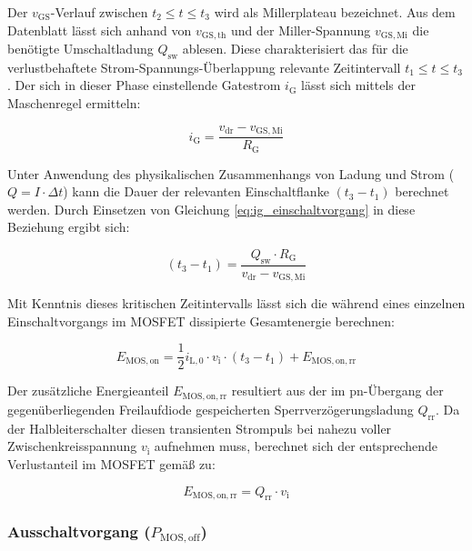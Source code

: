Der $v_\mathrm{GS}$-Verlauf zwischen $t_2 \le t \le t_3$ wird als Millerplateau bezeichnet. Aus dem Datenblatt lässt sich anhand von $v_\mathrm{GS,th}$ und der Miller-Spannung $v_\mathrm{GS,Mi}$ die benötigte Umschaltladung $Q_\mathrm{sw}$ ablesen. Diese charakterisiert das für die verlustbehaftete Strom-Spannungs-Überlappung relevante Zeitintervall $t_1 \le t \le t_3$. Der sich in dieser Phase einstellende Gatestrom $i_\mathrm{G}$ lässt sich mittels der Maschenregel ermitteln:

\begin{equation}
    i_\mathrm{G} = \frac{v_\mathrm{dr} - v_\mathrm{GS,Mi}}{R_\mathrm{G}}
    \label{eq:ig_einschaltvorgang}
\end{equation}

Unter Anwendung des physikalischen Zusammenhangs von Ladung und Strom ($Q = I \cdot \Delta t$) kann die Dauer der relevanten Einschaltflanke $(t_3 - t_1)$ berechnet werden. Durch Einsetzen von Gleichung \ref{eq:ig_einschaltvorgang} in diese Beziehung ergibt sich:

\begin{equation}
    (t_3 - t_1) = \frac{Q_\mathrm{sw} \cdot R_\mathrm{G}}{v_\mathrm{dr} - v_\mathrm{GS,Mi}}
    \label{eq:t3t1_einschaltvorgang}
\end{equation}

Mit Kenntnis dieses kritischen Zeitintervalls lässt sich die während eines einzelnen Einschaltvorgangs im MOSFET dissipierte Gesamtenergie berechnen:

\begin{equation}
    E_\mathrm{MOS,on} = \frac{1}{2} i_\mathrm{L,0} \cdot v_\mathrm{i} \cdot (t_3 - t_1) + E_{\mathrm{MOS,on,rr}}
    \label{eq:energie_einschaltvorgang}
\end{equation}

Der zusätzliche Energieanteil $E_{\mathrm{MOS,on,rr}}$ resultiert aus der im pn-Übergang der gegenüberliegenden Freilaufdiode gespeicherten Sperrverzögerungsladung $Q_{\mathrm{rr}}$. Da der Halbleiterschalter diesen transienten Strompuls bei nahezu voller Zwischenkreisspannung $v_\mathrm{i}$ aufnehmen muss, berechnet sich der entsprechende Verlustanteil im MOSFET gemäß \cite[S.~10]{Infineon_MOSFET_Losses} zu:

\begin{equation}
    E_{\mathrm{MOS,on,rr}} = Q_{\mathrm{rr}} \cdot v_\mathrm{i}
    \label{eq:energie_einschaltvorgang_rr}
\end{equation}

\subsubsection*{Ausschaltvorgang ($P_{\mathrm{MOS,off}}$)}

